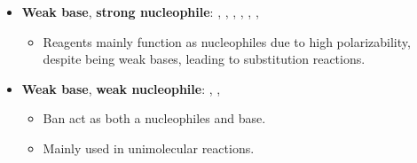\documentclass[12pt,a4paper]{article}
\begin{document}
\begin{itemize}
\begin{itemize}
\begin{itemize}
                \item {\color{darklc}\textbf{Weak base}}, \textbf{strong nucleophile}: {\color{neg}}, {\color{neg}}, {\color{neg}}, {\color{neg}}, {\color{neg}}, , 
                    \begin{itemize}
                        \item Reagents mainly function as nucleophiles due to high polarizability, despite being weak bases, leading to substitution reactions.
                    \end{itemize}
                \item {\color{darklc}\textbf{Weak base}}, {\color{darklc}\textbf{weak nucleophile}}: , , 
                    \begin{itemize}
                        \item Ban act as both a nucleophiles and base.
                        \item Mainly used in unimolecular reactions. 
                    \end{itemize}
            \end{itemize}
    \end{itemize}

\end{itemize}
\end{document}
